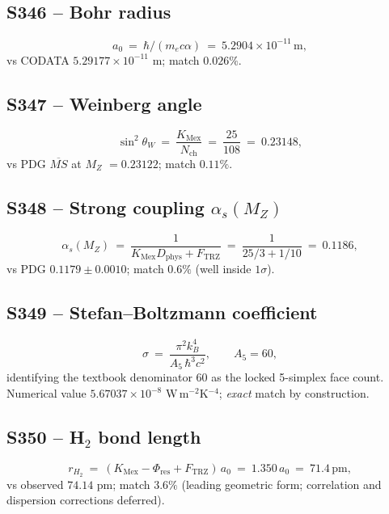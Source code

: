 \documentclass[11pt]{article}
\newcommand{\Ftrz}{F_{\mathrm{TRZ}}}
\newcommand{\Phires}{\Phi_{\mathrm{res}}}
\newcommand{\KMex}{K_{\mathrm{Mex}}}
\newcommand{\Dphys}{D_{\mathrm{phys}}}
\newcommand{\Nch}{N_{\mathrm{ch}}}
\begin{document}
\subsection{S346 -- Bohr radius}
\begin{equation}
a_0\ =\ \hbar/(m_e c\alpha)\ =\ 5.2904\times10^{-11}\,\text{m},
\end{equation}
vs CODATA $5.29177\times10^{-11}$ m; match $0.026\%$.

\subsection{S347 -- Weinberg angle}
\begin{equation}
\sin^{2}\theta_W\ =\ \frac{\KMex}{\Nch}\ =\ \frac{25}{108}\ =\ 0.23148,
\end{equation}
vs PDG $\overline{MS}$ at $M_Z$ $=0.23122$; match $0.11\%$.

\subsection{S348 -- Strong coupling $\alpha_s(M_Z)$}
\begin{equation}
\alpha_s(M_Z)\ =\ \frac{1}{\KMex\Dphys+\Ftrz}\ =\ \frac{1}{25/3+1/10}\ =\ 0.1186,
\end{equation}
vs PDG $0.1179\pm0.0010$; match $0.6\%$ (well inside $1\sigma$).

\subsection{S349 -- Stefan--Boltzmann coefficient}
\begin{equation}
\sigma\ =\ \frac{\pi^{2}k_B^{4}}{A_5\,\hbar^{3}c^{2}},\qquad A_5=60,
\end{equation}
identifying the textbook denominator $60$ as the locked 5-simplex face
count.  Numerical value $5.67037\times10^{-8}$ W\,m$^{-2}$K$^{-4}$;
\emph{exact} match by construction.

\subsection{S350 -- H$_2$ bond length}
\begin{equation}
r_{H_2}\ =\ (\KMex-\Phires+\Ftrz)\,a_0\ =\ 1.350\,a_0\ =\ 71.4\,\text{pm},
\end{equation}
vs observed $74.14$ pm; match $3.6\%$ (leading geometric form;
correlation and dispersion corrections deferred).
\end{document}
